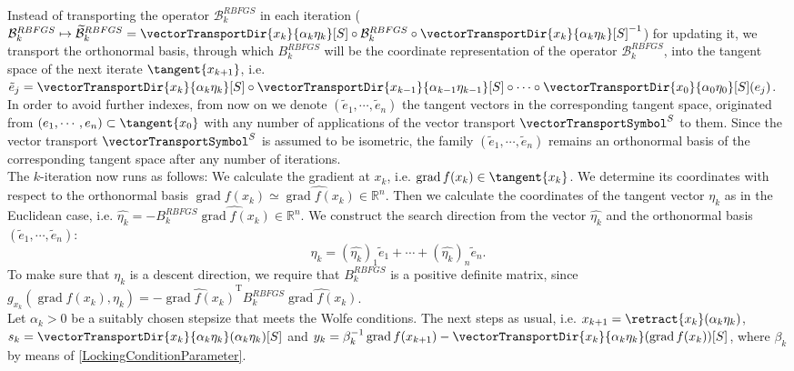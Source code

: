 Instead of transporting the operator $\mathcal{B}^{RBFGS}_k$ in each iteration ($\mathcal{B}^{RBFGS}_k \mapsto \widetilde{\mathcal{B}}^{RBFGS}_k = \vectorTransportDir{x_k}{\alpha_k \eta_k}[S] \circ \mathcal{B}^{RBFGS}_k \circ {\vectorTransportDir{x_k}{\alpha_k \eta_k}[S]}^{-1}$) for updating it, we transport the orthonormal basis, through which $B^{RBFGS}_k$ will be the coordinate representation of the operator $\mathcal{B}^{RBFGS}_k$, into the tangent space of the next iterate $\tangent{x_{k+1}}$, i.e. $\tilde{e}_j = \vectorTransportDir{x_k}{\alpha_k \eta_k}[S] \circ \vectorTransportDir{x_{k-1}}{\alpha_{k-1} \eta_{k-1}}[S] \circ \cdots \circ \vectorTransportDir{x_0}{\alpha_0 \eta_0}[S] (e_j)$. In order to avoid further indexes, from now on we denote $(\tilde{e}_1, \cdots, \tilde{e}_n)$ the tangent vectors in the corresponding tangent space, originated from $(e_1, \cdots, e_n) \subset \tangent{x_0}$ with any number of applications of the vector transport $\vectorTransportSymbol^S$ to them. Since the vector transport $\vectorTransportSymbol^S$ is assumed to be isometric, the family $(\tilde{e}_1, \cdots, \tilde{e}_n)$ remains an orthonormal basis of the corresponding tangent space after any number of iterations. \\
The $k$-iteration now runs as follows: We calculate the gradient at $x_k$, i.e. $\operatorname{grad} f(x_k) \in \tangent{x_k}$. We determine its coordinates with respect to the orthonormal basis $\operatorname{grad} f(x_k) \simeq \widehat{\operatorname{grad} f(x_k)}\in \mathbb{R}^n$. Then we calculate the coordinates of the tangent vector $\eta_k$ as in the Euclidean case, i.e. $\hat{\eta_k} = - B^{RBFGS}_k \widehat{\operatorname{grad} f(x_k)} \in \mathbb{R}^n$. We construct the search direction from the vector $\hat{\eta_k}$ and the orthonormal basis $(\tilde{e}_1, \cdots, \tilde{e}_n)$:
\begin{equation*}
    \eta_k = (\hat{\eta_k})_1 \tilde{e}_1 + \cdots + (\hat{\eta_k})_n \tilde{e}_n.
\end{equation*}
To make sure that $\eta_k$ is a descent direction, we require that $B^{RBFGS}_k$ is a positive definite matrix, since $g_{x_k}(\operatorname{grad} f(x_k), \eta_k) = - \widehat{\operatorname{grad} f(x_k)}^{\mathrm{T}} B^{RBFGS}_k \widehat{\operatorname{grad} f(x_k)}$. \\
Let $\alpha_k > 0$ be a suitably chosen stepsize that meets the Wolfe conditions. The next steps as usual, i.e. $x_{k+1} = \retract{x_k}(\alpha_k \eta_k)$, $s_k = \vectorTransportDir{x_k}{\alpha_k \eta_k}(\alpha_k \eta_k)[S]$ and $y_k = \beta^{-1}_k \operatorname{grad} f(x_{k+1}) - \vectorTransportDir{x_k}{\alpha_k \eta_k}(\operatorname{grad} f(x_k))[S]$, where $\beta_k$ by means of \cref{LockingConditionParameter}. \\
